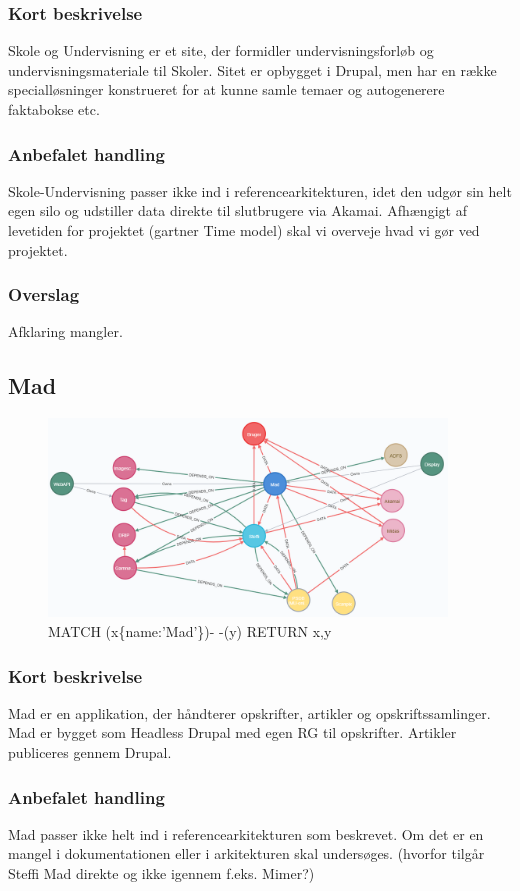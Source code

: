 \documentclass{article}
\begin{document}
\subsubsection{Kort beskrivelse}
Skole og Undervisning er et site, der formidler undervisningsforløb og undervisningsmateriale til Skoler.  Sitet er opbygget i Drupal, men har en række specialløsninger konstrueret for at kunne samle temaer og autogenerere faktabokse etc. 
\subsubsection{Anbefalet handling}
Skole-Undervisning passer ikke ind i referencearkitekturen, idet den udgør sin helt egen silo og udstiller data direkte til slutbrugere via Akamai. 
Afhængigt af levetiden for projektet (gartner Time model) skal vi overveje hvad vi gør ved projektet.
\subsubsection{Overslag}
Afklaring mangler.

\subsection{Mad}
\begin{figure}[h]
\includegraphics[width=300pt]{Mad.PNG}
\caption{MATCH (x\{name:'Mad'\})- -(y) RETURN x,y}
\end{figure}
\subsubsection{Kort beskrivelse}
Mad er en applikation, der håndterer opskrifter, artikler og opskriftssamlinger. Mad er bygget som Headless Drupal med egen RG til opskrifter. Artikler publiceres gennem Drupal. 
\subsubsection{Anbefalet handling}
Mad passer ikke helt ind i referencearkitekturen som beskrevet. Om det er en mangel i dokumentationen eller i arkitekturen skal undersøges. (hvorfor tilgår Steffi Mad direkte og ikke igennem f.eks. Mimer?)
\end{document}
